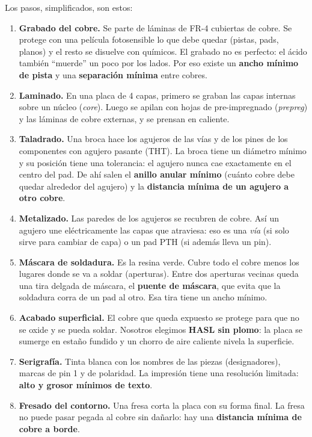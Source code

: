 Los pasos, simplificados, son estos:
\begin{enumerate}
  \item \textbf{Grabado del cobre.} Se parte de láminas de FR-4 cubiertas de cobre. Se protege con una película
        fotosensible lo que debe quedar (pistas, pads, planos) y el resto se disuelve con químicos. El grabado no
        es perfecto: el ácido también ``muerde'' un poco por los lados. Por eso existe un \textbf{ancho mínimo de
        pista} y una \textbf{separación mínima} entre cobres.
  \item \textbf{Laminado.} En una placa de 4 capas, primero se graban las capas internas sobre un núcleo
        (\emph{core}). Luego se apilan con hojas de pre-impregnado (\emph{prepreg}) y las láminas de cobre
        externas, y se prensan en caliente.
  \item \textbf{Taladrado.} Una broca hace los agujeros de las vías y de los pines de los componentes con agujero
        pasante (THT). La broca tiene un diámetro mínimo y su posición tiene una tolerancia: el agujero nunca cae
        exactamente en el centro del pad. De ahí salen el \textbf{anillo anular mínimo} (cuánto cobre debe quedar
        alrededor del agujero) y la \textbf{distancia mínima de un agujero a otro cobre}.
  \item \textbf{Metalizado.} Las paredes de los agujeros se recubren de cobre. Así un agujero une eléctricamente
        las capas que atraviesa: eso es una \emph{vía} (si solo sirve para cambiar de capa) o un pad PTH (si además
        lleva un pin).
  \item \textbf{Máscara de soldadura.} Es la resina verde. Cubre todo el cobre menos los lugares donde se va a
        soldar (aperturas). Entre dos aperturas vecinas queda una tira delgada de máscara, el \textbf{puente de
        máscara}, que evita que la soldadura corra de un pad al otro. Esa tira tiene un ancho mínimo.
  \item \textbf{Acabado superficial.} El cobre que queda expuesto se protege para que no se oxide y se pueda
        soldar. Nosotros elegimos \textbf{HASL sin plomo}: la placa se sumerge en estaño fundido y un chorro de
        aire caliente nivela la superficie.
  \item \textbf{Serigrafía.} Tinta blanca con los nombres de las piezas (designadores), marcas de pin 1 y de
        polaridad. La impresión tiene una resolución limitada: \textbf{alto y grosor mínimos de texto}.
  \item \textbf{Fresado del contorno.} Una fresa corta la placa con su forma final. La fresa no puede pasar
        pegada al cobre sin dañarlo: hay una \textbf{distancia mínima de cobre a borde}.
\end{enumerate}

